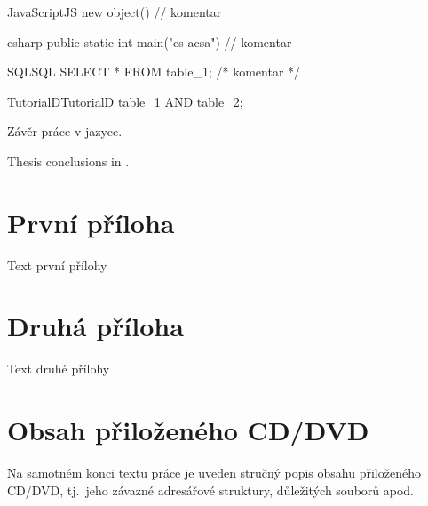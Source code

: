 \documentclass[
  biblatex,
  glossaries,
  index
]{kidiplom}
\begin{document}
\begin{kicode}{JavaScript}{}{JS}
new object() // komentar
\end{kicode}

\begin{kicode}{csharp}{}{\csharp}
public static int main("cs acsa") // komentar
\end{kicode}

\begin{kicode}{SQL}{}{SQL}
SELECT * FROM table_1; /* komentar */
\end{kicode}

\begin{kicode}{TutorialD}{}{TutorialD}
table_1 AND table_2;
\end{kicode}

\begin{kiconclusions}
Závěr práce v  jazyce.
\end{kiconclusions}

\begin{kiconclusions}[english]
Thesis conclusions in .
\end{kiconclusions}

\appendix

\section{První příloha}
Text první přílohy

\section{Druhá příloha}
Text druhé přílohy

\section{Obsah přiloženého CD/DVD} \label{sec:ObsahCD}

Na samotném konci textu práce je uveden stručný popis obsahu
přiloženého CD/DVD, tj.~jeho závazné adresářové struktury, důležitých
souborů apod.
\end{document}

